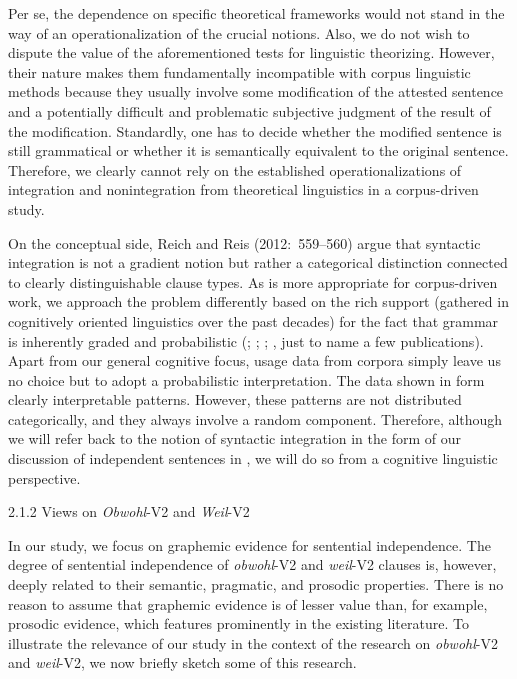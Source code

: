 \begin{styleMoutonText}
Per se, the dependence on specific theoretical frameworks would not stand in the way of an operationalization of the crucial notions. Also, we do not wish to dispute the value of the aforementioned tests for linguistic theorizing. However, their nature makes them fundamentally incompatible with corpus linguistic methods because they usually involve some modification of the attested sentence and a potentially difficult and problematic subjective judgment of the result of the modification. Standardly, one has to decide whether the modified sentence is still grammatical or whether it is semantically equivalent to the original sentence. Therefore, we clearly cannot rely on the established operationalizations of integration and nonintegration from theoretical linguistics in a corpus-driven study.
\end{styleMoutonText}

\begin{styleMoutonText}
On the conceptual side, Reich and Reis (2012:~559–560) argue that syntactic integration is not a gradient notion but rather a categorical distinction connected to clearly distinguishable clause types. As is more appropriate for corpus-driven work, we approach the problem differently based on the rich support (gathered in cognitively oriented linguistics over the past decades) for the fact that grammar is inherently graded and probabilistic (\citealt{Manning2003}; \citealt{HayBaayen2005}; \citealt{Bresnan2007}; \citealt{Kapatsinski2014}, just to name a few publications). Apart from our general cognitive focus, usage data from corpora simply leave us no choice but to adopt a probabilistic interpretation. The data shown in  form clearly interpretable patterns. However, these patterns are not distributed categorically, and they always involve a random component. Therefore, although we will refer back to the notion of syntactic integration in the form of our discussion of independent sentences in , we will do so from a cognitive linguistic perspective.
\end{styleMoutonText}

\begin{styleMoutonHeadingii}
2.1.2  Views on \textit{Obwohl}{}-V2 and \textit{Weil}{}-V2
\end{styleMoutonHeadingii}

\begin{styleMoutonText}
In our study, we focus on graphemic evidence for sentential independence. The degree of sentential independence of \textit{obwohl}{}-V2 and \textit{weil}{}-V2 clauses is, however, deeply related to their semantic, pragmatic, and prosodic properties. There is no reason to assume that graphemic evidence is of lesser value than, for example, prosodic evidence, which features prominently in the existing literature. To illustrate the relevance of our study in the context of the research on \textit{obwohl}{}-V2 and \textit{weil}{}-V2, we now briefly sketch some of this research.
\end{styleMoutonText}

